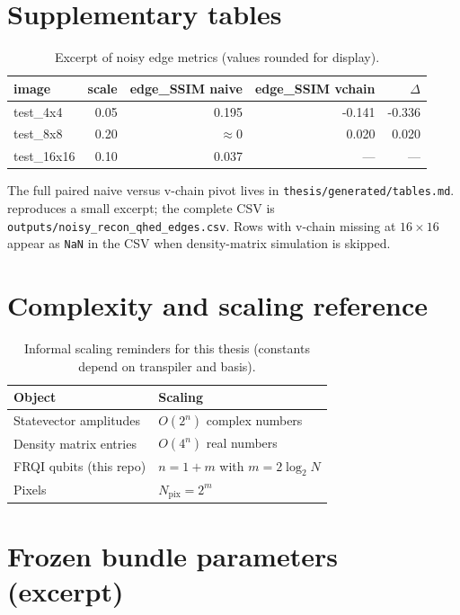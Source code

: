 \chapter{Supplementary tables}

\begin{table}[htbp]
\centering
\caption{Excerpt of noisy edge metrics (values rounded for display).}
\label{tab:noisy-wide-excerpt}
\footnotesize
\begin{tabular}{lrrrr}
\toprule
image & scale & edge\_SSIM naive & edge\_SSIM vchain & $\Delta$ \\
\midrule
test\_4x4 & 0.05 & 0.195 & -0.141 & -0.336 \\
test\_8x8 & 0.20 & $\approx 0$ & 0.020 & 0.020 \\
test\_16x16 & 0.10 & 0.037 & --- & --- \\
\bottomrule
\end{tabular}
\end{table}
The full paired naive versus v-chain pivot lives in \texttt{thesis/generated/tables.md}.  reproduces a small excerpt; the complete CSV is \texttt{outputs/noisy\_recon\_qhed\_edges.csv}.
Rows with v-chain missing at $16\times16$ appear as \texttt{NaN} in the CSV when density-matrix simulation is skipped.

\chapter{Complexity and scaling reference}

\begin{table}[htbp]
\centering
\caption{Informal scaling reminders for this thesis (constants depend on transpiler and basis).}
\begin{tabular}{ll}
\toprule
Object & Scaling \\
\midrule
Statevector amplitudes & $O(2^n)$ complex numbers \\
Density matrix entries & $O(4^n)$ real numbers \\
FRQI qubits (this repo) & $n = 1 + m$ with $m=2\log_2 N$ \\
Pixels & $N_{\mathrm{pix}} = 2^m$ \\
\bottomrule
\end{tabular}
\end{table}

\chapter{Frozen bundle parameters (excerpt)}

